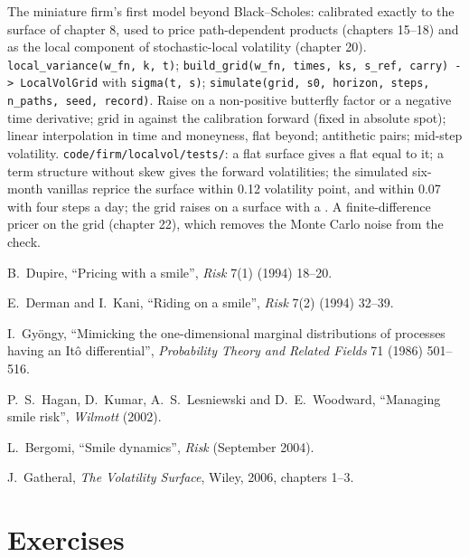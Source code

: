 \begin{build}
 The miniature firm's first model beyond Black--Scholes: calibrated exactly to the surface of
chapter 8, used to price path-dependent products (chapters 15--18) and as the local component of stochastic-local
volatility (chapter 20).
 \texttt{local\_variance(w\_fn, k, t)}; \texttt{build\_grid(w\_fn, times, ks, s\_ref, carry)
-> LocalVolGrid} with \texttt{sigma(t, s)}; \texttt{simulate(grid, s0, horizon, steps, n\_paths, seed,
record)}.
 Raise on a non-positive butterfly factor or a negative time derivative; grid in 
against the calibration forward (fixed in absolute spot); linear interpolation in time and moneyness, flat
beyond; antithetic pairs; mid-step volatility.
 \texttt{code/firm/localvol/tests/}: a flat surface gives a flat  equal
to it; a term structure without skew gives the forward volatilities; the simulated six-month vanillas reprice the
surface within 0.12 volatility point, and within 0.07 with four steps a day; the grid raises on a surface with
a .
 A finite-difference pricer on the  grid (chapter 22), which removes the Monte
Carlo noise from the check.
\end{build}

\begin{omsources}
\item B.~Dupire, ``Pricing with a smile'', \emph{Risk} 7(1) (1994) 18--20.
\item E.~Derman and I.~Kani, ``Riding on a smile'', \emph{Risk} 7(2) (1994) 32--39.
\item I.~Gyöngy, ``Mimicking the one-dimensional marginal distributions of processes having an Itô
differential'', \emph{Probability Theory and Related Fields} 71 (1986) 501--516.
\item P.~S.~Hagan, D.~Kumar, A.~S.~Lesniewski and D.~E.~Woodward, ``Managing smile risk'', \emph{Wilmott}
(2002).
\item L.~Bergomi, ``Smile dynamics'', \emph{Risk} (September 2004).
\item J.~Gatheral, \emph{The Volatility Surface}, Wiley, 2006, chapters 1--3.
\end{omsources}

\section{Exercises}

